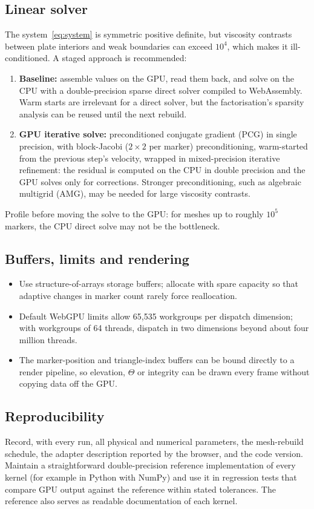 \documentclass[11pt]{article}
\begin{document}
\subsection{Linear solver}
\label{sec:gpusolve}
The system~\eqref{eq:system} is symmetric positive definite, but viscosity contrasts between plate interiors and weak boundaries can exceed $10^4$, which makes it ill-conditioned. A staged approach is recommended:
\begin{enumerate}
\item \textbf{Baseline:} assemble values on the GPU, read them back, and solve on the CPU with a double-precision sparse direct solver compiled to WebAssembly. Warm starts are irrelevant for a direct solver, but the factorisation's sparsity analysis can be reused until the next rebuild.
\item \textbf{GPU iterative solve:} preconditioned conjugate gradient (PCG) in single precision, with block-Jacobi ($2\times2$ per marker) preconditioning, warm-started from the previous step's velocity, wrapped in mixed-precision iterative refinement: the residual is computed on the CPU in double precision and the GPU solves only for corrections. Stronger preconditioning, such as algebraic multigrid (AMG), may be needed for large viscosity contrasts.
\end{enumerate}
Profile before moving the solve to the GPU: for meshes up to roughly $10^5$ markers, the CPU direct solve may not be the bottleneck.

\subsection{Buffers, limits and rendering}
\begin{itemize}
\item Use structure-of-arrays storage buffers; allocate with spare capacity so that adaptive changes in marker count rarely force reallocation.
\item Default WebGPU limits allow 65{,}535 workgroups per dispatch dimension; with workgroups of 64 threads, dispatch in two dimensions beyond about four million threads.
\item The marker-position and triangle-index buffers can be bound directly to a render pipeline, so elevation, $\Theta$ or integrity can be drawn every frame without copying data off the GPU.
\end{itemize}

\subsection{Reproducibility}
Record, with every run, all physical and numerical parameters, the mesh-rebuild schedule, the adapter description reported by the browser, and the code version. Maintain a straightforward double-precision reference implementation of every kernel (for example in Python with NumPy) and use it in regression tests that compare GPU output against the reference within stated tolerances. The reference also serves as readable documentation of each kernel.
\end{document}
